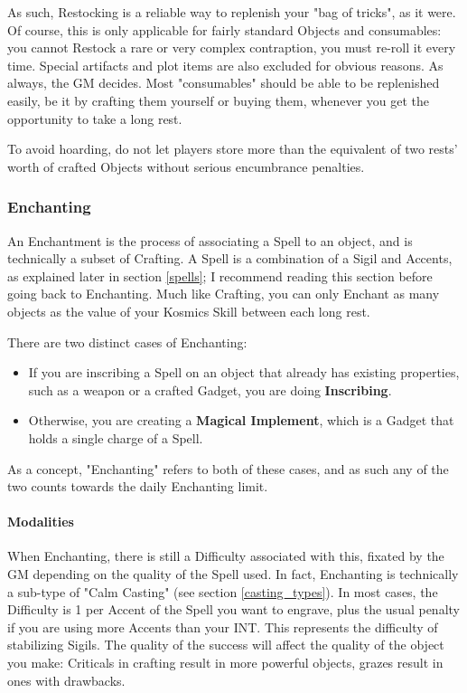 As such, Restocking is a reliable way to replenish your "bag of tricks", as it were. Of course, this is only applicable for fairly standard Objects and consumables: you cannot Restock a rare or very complex contraption, you must re-roll it every time. Special artifacts and plot items are also excluded for obvious reasons. As always, the GM decides. Most "consumables" should be able to be replenished easily, be it by crafting them yourself or buying them, whenever you get the opportunity to take a long rest. 

To avoid hoarding, do not let players store more than the equivalent of two rests' worth of crafted Objects without serious encumbrance penalties.



\subsubsection{Enchanting}


\label{enchanting}

An Enchantment is the process of associating a Spell to an object, and is technically a subset of Crafting. A Spell is a combination of a Sigil and Accents, as explained later in section \ref{spells}; I recommend reading this section before going back to Enchanting. Much like Crafting, you can only Enchant as many objects as the value of your Kosmics Skill between each long rest.

There are two distinct cases of Enchanting:
\begin{itemize}
	\item If you are inscribing a Spell on an object that already has existing properties, such as a weapon or a crafted Gadget, you are doing \textbf{Inscribing}.
	\item Otherwise, you are creating a \textbf{Magical Implement}, which is a Gadget that holds a single charge of a Spell.
\end{itemize}
As a concept, "Enchanting" refers to both of these cases, and as such any of the two counts towards the daily Enchanting limit.


\paragraph{Modalities}

When Enchanting, there is still a Difficulty associated with this, fixated by the GM depending on the quality of the Spell used. In fact, Enchanting is technically a sub-type of "Calm Casting" (see section \ref{casting_types}). In most cases, the Difficulty is 1 per Accent of the Spell you want to engrave, plus the usual penalty if you are using more Accents than your INT. This represents the difficulty of stabilizing Sigils. The quality of the success will affect the quality of the object you make: Criticals in crafting result in more powerful objects, grazes result in ones with drawbacks.
	
